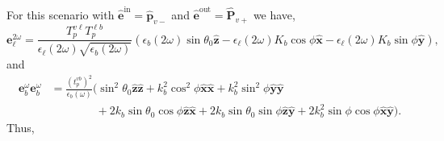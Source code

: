 For this scenario with $\hat{\mathbf{e}}^{\mathrm{in}}=\hat{\mathbf{p}}_{v-}$
and $\hat{\mathbf{e}}^{\mathrm{out}}=\hat{\mathbf{P}}_{v+}$ we have,
\begin{equation*}\label{ri12}
\mathbf{e}^{2\omega}_{\ell} =
\frac{T^{v\ell}_{p}T^{\ell b}_{p}}
     {\epsilon_{\ell}({2\omega})\sqrt{\epsilon_{b}(2\omega)}}
\left(
  \epsilon_{b}(2\omega)\sin\theta_{0}\hat{\mathbf{z}}
- \epsilon_{\ell}(2\omega)K_{b}\cos\phi\hat{\mathbf{x}}
- \epsilon_{\ell}(2\omega)K_{b}\sin\phi\hat{\mathbf{y}}
\right),
\end{equation*}
and
\begin{equation*}
\begin{split}
\mathbf{e}^{\omega}_{b}\mathbf{e}^{\omega}_{b}
&= \frac{\left(t^{vb}_{p}\right)^{2}}{\epsilon_{b}(\omega)}
\big(
  \sin^{2}\theta_{0}\hat{\mathbf{z}}\hat{\mathbf{z}}
+ k^{2}_{b}\cos^{2}\phi\hat{\mathbf{x}}\hat{\mathbf{x}}
+ k^{2}_{b}\sin^{2}\phi\hat{\mathbf{y}}\hat{\mathbf{y}}\\
&\qquad\qquad
+ 2k_{b}\sin\theta_{0}\cos\phi\hat{\mathbf{z}}\hat{\mathbf{x}}
+ 2k_{b}\sin\theta_{0}\sin\phi\hat{\mathbf{z}}\hat{\mathbf{y}}
+ 2k^{2}_{b}\sin\phi\cos\phi\hat{\mathbf{x}}\hat{\mathbf{y}}
\big).
\end{split}
\end{equation*}
Thus,
